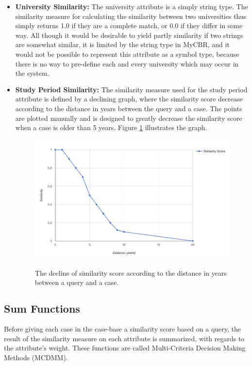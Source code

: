 \begin{itemize}
    \item \textbf{University Similarity:} The university attribute is a simply string type. The similarity measure for calculating the similarity between two universities thus simply returns 1.0 if they are a complete match, or 0.0 if they differ in some way. All though it would be desirable to yield partly similarity if two strings are somewhat similar, it is limited by the string type in MyCBR, and it would not be possible to represent this attribute as a symbol type, because there is no way to pre-define each and every university which may occur in the system. 
    
    \item \textbf{Study Period Similarity:} The similarity measure used for the study period attribute is defined by a declining graph, where the similarity score decrease according to the distance in years between the query and a case. The points are plotted manually and is designed to greatly decrease the similarity score when a case is older than 5 years. Figure \ref{fig:study_period_graph} illustrates the graph.
    
    \begin{figure}[H]
        \centering
        \caption{The decline of similarity score according to the distance in years between a query and a case.}
        \includegraphics[width=1.0\textwidth]{fig/study_period_graph.png}
        \label{fig:study_period_graph}
    \end{figure}
    
\end{itemize}

\subsection{Sum Functions}
Before giving each case in the case-base a similarity score based on a query, the result of the similarity measure on each attribute is summarized, with regards to the attribute's weight. These functions are called Multi-Criteria Decision Making Methods (MCDMM).

